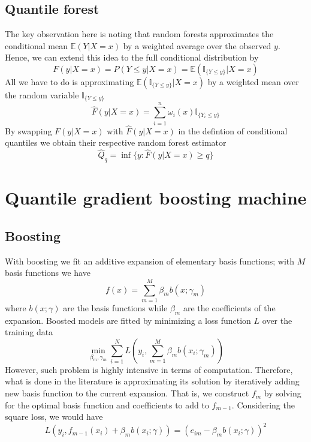 \subsection{Quantile forest}
The key observation here is noting that random forests approximates the conditional mean $\mathbb{E}(Y|X=x)$ by a weighted average over the observed $y$.
Hence, we can extend this idea to the full conditional distribution by
\begin{equation}
    F(y|X=x)=P(Y\leq y|X=x)=\mathbb{E}(\mathbb{I}_{\{Y\leq y\}}|X=x)
\end{equation}
All we have to do is approximating $\mathbb{E}(\mathbb{I}_{\{Y\leq y\}}|X=x)$ by a weighted mean over the random variable $\mathbb{I}_{\{Y\leq y\}}$
\begin{equation}
    \hat{F}(y|X=x)=\sum\limits_{i=1}^{n}\omega_i(x)\mathbb{I}_{\{Y_i\leq y\}}
\end{equation}
By swapping $F(y|X=x)$ with $\hat{F}(y|X=x)$ in the defintion of conditional quantiles we obtain their respective random forest estimator
\begin{equation}
    \hat{Q}_q=\inf\{y:\hat{F}(y|X=x)\geq q\}
\end{equation}


\section{Quantile gradient boosting machine}
\subsection{Boosting}
With boosting we fit an additive expansion of elementary basis functions; with $M$ basis functions we have 
\begin{equation}
    f(x)=\sum\limits_{m=1}^{M}\beta_m b(x;\gamma_m)
\end{equation}
where $b(x;\gamma)$ are the basis functions while $\beta_m$ are the coefficients of the expansion.
Boosted models are fitted by minimizing a loss function $L$ over the training data
\begin{equation}
    \min_{\beta_m, \gamma_m}\sum\limits_{i=1}^{N}L\left(y_i, \sum\limits_{m=1}^M \beta_m b(x_i;\gamma_m)\right)
\end{equation}
However, such problem is highly intensive in terms of computation. Therefore, what is done in the literature is approximating its solution by iteratively adding new basis function to the current expansion. That is, we construct $f_m$ by solving for the optimal basis function and coefficients to add to $f_{m-1}$. Considering the square loss, we would have
\begin{equation}
    L(y_i, f_{m-1}(x_i)+\beta_m b(x_i;\gamma))=(e_{im}-\beta_m b(x_i;\gamma))^2
\end{equation}

